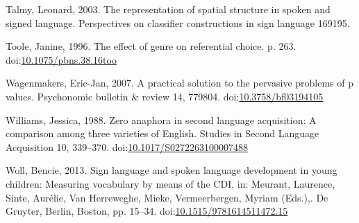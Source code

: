 \documentclass[]{elsarticle} %
\newlength{\cslhangindent}
\newenvironment{CSLReferences}[2] %
 {%
  \setlength{\parindent}{0pt}
  \ifodd #1 \everypar{\setlength{\hangindent}{\cslhangindent}}\ignorespaces\fi
  \ifnum #2 > 0
  \setlength{\parskip}{#2\baselineskip}
  \fi
 }%
 {}
\begin{document}
\begin{CSLReferences}{1}{0}
\leavevmode{}%
Talmy, Leonard, 2003. The representation of spatial structure in spoken
and signed language. Perspectives on classifier constructions in sign
language 169195.

\leavevmode{}%
Toole, Janine, 1996. The effect of genre on referential choice. p. 263.
doi:\href{https://doi.org/10.1075/pbns.38.16too}{10.1075/pbns.38.16too}

\leavevmode{}%
Wagenmakers, Eric-Jan, 2007. A practical solution to the pervasive
problems of p values. Psychonomic bulletin \& review 14, 779804.
doi:\href{https://doi.org/10.3758/bf03194105}{10.3758/bf03194105}

\leavevmode{}%
Williams, Jessica, 1988. Zero anaphora in second language acquisition: A
comparison among three varieties of English. Studies in Second Language
Acquisition 10, 339--370.
doi:\href{https://doi.org/10.1017/S0272263100007488}{10.1017/S0272263100007488}

\leavevmode{}%
Woll, Bencie, 2013. Sign language and spoken language development in
young children: Measuring vocabulary by means of the CDI, in: Meurant,
Laurence, Sinte, Aurélie, Van Herreweghe, Mieke, Vermeerbergen, Myriam
(Eds.),. De Gruyter, Berlin, Boston, pp. 15--34.
doi:\href{https://doi.org/10.1515/9781614511472.15}{10.1515/9781614511472.15}

\end{CSLReferences}
\end{document}
